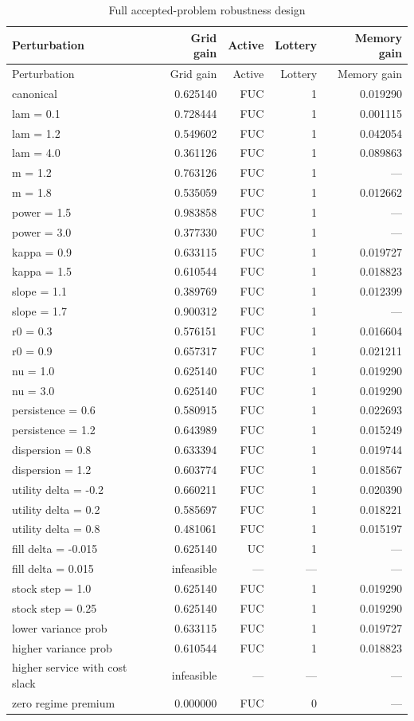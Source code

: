 \begin{longtable}{p{}rrrr}
\caption{Full accepted-problem robustness design}\label{tab:robust-all}\\
\toprule Perturbation & Grid gain & Active & Lottery & Memory gain\\\midrule\endfirsthead
\toprule Perturbation & Grid gain & Active & Lottery & Memory gain\\\midrule\endhead
canonical & 0.625140 & FUC & 1 & 0.019290\\
lam = 0.1 & 0.728444 & FUC & 1 & 0.001115\\
lam = 1.2 & 0.549602 & FUC & 1 & 0.042054\\
lam = 4.0 & 0.361126 & FUC & 1 & 0.089863\\
m = 1.2 & 0.763126 & FUC & 1 & ---\\
m = 1.8 & 0.535059 & FUC & 1 & 0.012662\\
power = 1.5 & 0.983858 & FUC & 1 & ---\\
power = 3.0 & 0.377330 & FUC & 1 & ---\\
kappa = 0.9 & 0.633115 & FUC & 1 & 0.019727\\
kappa = 1.5 & 0.610544 & FUC & 1 & 0.018823\\
slope = 1.1 & 0.389769 & FUC & 1 & 0.012399\\
slope = 1.7 & 0.900312 & FUC & 1 & ---\\
r0 = 0.3 & 0.576151 & FUC & 1 & 0.016604\\
r0 = 0.9 & 0.657317 & FUC & 1 & 0.021211\\
nu = 1.0 & 0.625140 & FUC & 1 & 0.019290\\
nu = 3.0 & 0.625140 & FUC & 1 & 0.019290\\
persistence = 0.6 & 0.580915 & FUC & 1 & 0.022693\\
persistence = 1.2 & 0.643989 & FUC & 1 & 0.015249\\
dispersion = 0.8 & 0.633394 & FUC & 1 & 0.019744\\
dispersion = 1.2 & 0.603774 & FUC & 1 & 0.018567\\
utility delta = -0.2 & 0.660211 & FUC & 1 & 0.020390\\
utility delta = 0.2 & 0.585697 & FUC & 1 & 0.018221\\
utility delta = 0.8 & 0.481061 & FUC & 1 & 0.015197\\
fill delta = -0.015 & 0.625140 & UC & 1 & ---\\
fill delta = 0.015 & infeasible & --- & --- & ---\\
stock step = 1.0 & 0.625140 & FUC & 1 & 0.019290\\
stock step = 0.25 & 0.625140 & FUC & 1 & 0.019290\\
lower variance prob & 0.633115 & FUC & 1 & 0.019727\\
higher variance prob & 0.610544 & FUC & 1 & 0.018823\\
higher service with cost slack & infeasible & --- & --- & ---\\
zero regime premium & 0.000000 & FUC & 0 & ---\\
\bottomrule\end{longtable}

